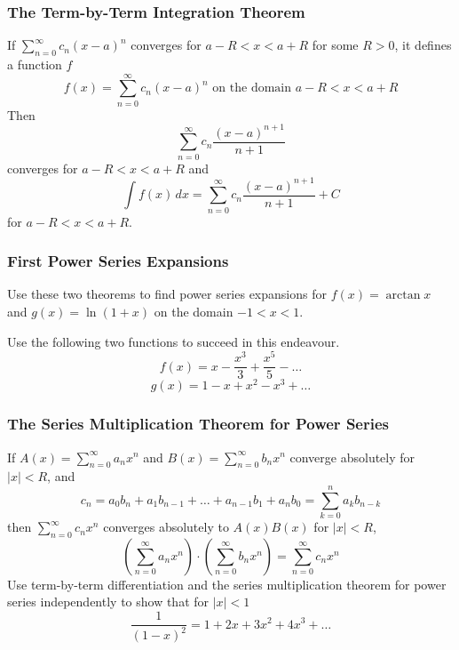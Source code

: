 \documentclass[xcolor=dvipsnames]{beamer}
\begin{document}
\begin{frame}
  \frametitle{The Term-by-Term Integration Theorem}
  If $\sum_{n=0}^{\infty}c_{n}(x-a)^{n}$ converges for $a-R<x<a+R$ for some $R>0$, it defines a function $f$
  \begin{equation}
    \label{eq:ohmaekel}
    f(x)=\sum_{n=0}^{\infty}c_{n}(x-a)^{n}\mbox{ on the domain }a-R<x<a+R
  \end{equation}
  Then
  \begin{equation}
    \label{eq:iechaefi}
    \sum_{n=0}^{\infty}c_{n}\frac{(x-a)^{n+1}}{n+1}
  \end{equation}
converges for $a-R<x<a+R$ and
  \begin{equation}
    \label{eq:aibooqui}
    \int{}f(x)\,dx=\sum_{n=0}^{\infty}c_{n}\frac{(x-a)^{n+1}}{n+1}+C
  \end{equation}
for $a-R<x<a+R$.
\end{frame}

\begin{frame}
  \frametitle{First Power Series Expansions}
  Use these two theorems to find power series expansions for $f(x)=\arctan{}x$ and $g(x)=\ln{}(1+x)$ on the domain $-1<x<1$.

  \bigskip

  Use the following two functions to succeed in this endeavour.
  \begin{equation}
    \label{eq:tohpojos}
    f(x)=x-\frac{x^{3}}{3}+\frac{x^{5}}{5}-{\ldots}
  \end{equation}
  \begin{equation}
    \label{eq:queiroxu}
    g(x)=1-x+x^{2}-x^{3}+{\ldots}
  \end{equation}
\end{frame}

\begin{frame}
  \frametitle{The Series Multiplication Theorem for Power Series}
  If $A(x)=\sum_{n=0}^{\infty}a_{n}x^{n}$ and
  $B(x)=\sum_{n=0}^{\infty}b_{n}x^{n}$ converge absolutely for
  $|x|<R$, and
  \begin{equation}
    \label{eq:quewahre}
    c_{n}=a_{0}b_{n}+a_{1}b_{n-1}+{\ldots}+a_{n-1}b_{1}+a_{n}b_{0}=\sum_{k=0}^{n}a_{k}b_{n-k}
  \end{equation}
then $\sum_{n=0}^{\infty}c_{n}x^{n}$ converges absolutely to
$A(x)B(x)$ for $|x|<R$,
\begin{equation}
  \label{eq:axoochid}
  \left(\sum_{n=0}^{\infty}a_{n}x^{n}\right)\cdot\left(\sum_{n=0}^{\infty}b_{n}x^{n}\right)=\sum_{n=0}^{\infty}c_{n}x^{n}
\end{equation}
Use term-by-term differentiation and the series multiplication theorem
for power series independently to show that for $|x|<1$
\begin{equation}
  \label{eq:kahfeipe}
  \frac{1}{(1-x)^{2}}=1+2x+3x^{2}+4x^{3}+{\ldots}
\end{equation}
\end{frame}
\end{document}
